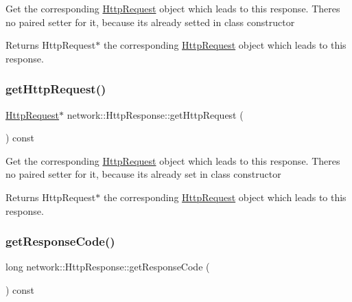 Get the corresponding \hyperlink{classnetwork_1_1HttpRequest}{Http\+Request} object which leads to this response. There\textquotesingle{}s no paired setter for it, because it\textquotesingle{}s already setted in class constructor \begin{DoxyReturn}{Returns}
Http\+Request$\ast$ the corresponding \hyperlink{classnetwork_1_1HttpRequest}{Http\+Request} object which leads to this response. 
\end{DoxyReturn}
\mbox{\label{classnetwork_1_1HttpResponse_a9f5228a87f350055ae7316d6dc26e26f}} 
\subsubsection{\texorpdfstring{get\+Http\+Request()}{getHttpRequest()}\hspace{0.1cm}{\footnotesize\ttfamily [2/2]}}
{\footnotesize\ttfamily \hyperlink{classnetwork_1_1HttpRequest}{Http\+Request}$\ast$ network\+::\+Http\+Response\+::get\+Http\+Request (\begin{DoxyParamCaption}{ }\end{DoxyParamCaption}) const\hspace{0.3cm}{\ttfamily [inline]}}

Get the corresponding \hyperlink{classnetwork_1_1HttpRequest}{Http\+Request} object which leads to this response. There\textquotesingle{}s no paired setter for it, because it\textquotesingle{}s already set in class constructor \begin{DoxyReturn}{Returns}
Http\+Request$\ast$ the corresponding \hyperlink{classnetwork_1_1HttpRequest}{Http\+Request} object which leads to this response. 
\end{DoxyReturn}
\mbox{\label{classnetwork_1_1HttpResponse_aa968e433339f10f30bee2998e0c237d4}} 
\subsubsection{\texorpdfstring{get\+Response\+Code()}{getResponseCode()}\hspace{0.1cm}{\footnotesize\ttfamily [1/2]}}
{\footnotesize\ttfamily long network\+::\+Http\+Response\+::get\+Response\+Code (\begin{DoxyParamCaption}{ }\end{DoxyParamCaption}) const\hspace{0.3cm}{\ttfamily [inline]}}

